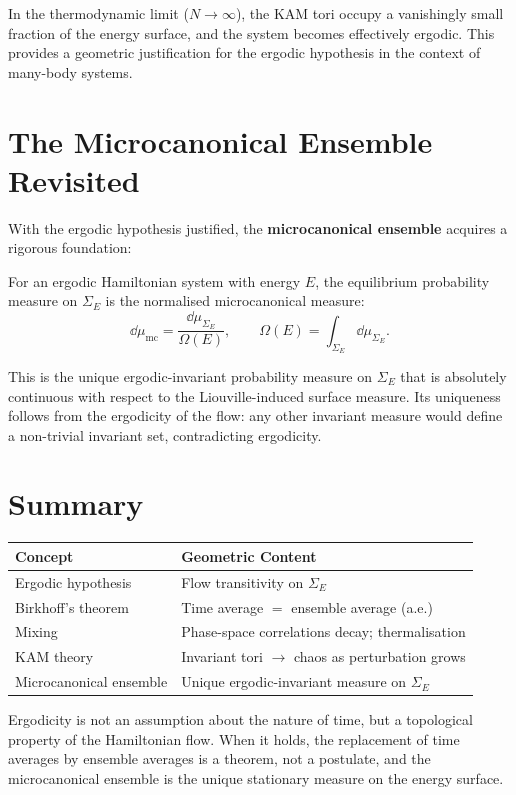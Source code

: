 In the thermodynamic limit ($N \to \infty$), the KAM tori occupy a vanishingly small fraction of the energy surface, and the system becomes effectively ergodic. This provides a geometric justification for the ergodic hypothesis in the context of many-body systems.

\section{The Microcanonical Ensemble Revisited}

With the ergodic hypothesis justified, the \textbf{microcanonical ensemble} acquires a rigorous foundation:

\begin{definition}
For an ergodic Hamiltonian system with energy $E$, the equilibrium probability measure on $\Sigma_E$ is the normalised microcanonical measure:
\begin{equation}
\dd\mu_{\text{mc}} = \frac{\dd\mu_{\Sigma_E}}{\Omega(E)}, \qquad \Omega(E) = \int_{\Sigma_E}\dd\mu_{\Sigma_E}.
\end{equation}
\end{definition}

This is the unique ergodic-invariant probability measure on $\Sigma_E$ that is absolutely continuous with respect to the Liouville-induced surface measure. Its uniqueness follows from the ergodicity of the flow: any other invariant measure would define a non-trivial invariant set, contradicting ergodicity.

\section{Summary}

\begin{table}[H]
\centering
\renewcommand{\arraystretch}{1.6}
\begin{tabular}{ll}
\toprule
\textbf{Concept} & \textbf{Geometric Content} \\
\midrule
Ergodic hypothesis & Flow transitivity on $\Sigma_E$ \\
Birkhoff's theorem & Time average $=$ ensemble average (a.e.) \\
Mixing & Phase-space correlations decay; thermalisation \\
KAM theory & Invariant tori $\to$ chaos as perturbation grows \\
Microcanonical ensemble & Unique ergodic-invariant measure on $\Sigma_E$ \\
\bottomrule
\end{tabular}
\end{table}

Ergodicity is not an assumption about the nature of time, but a topological property of the Hamiltonian flow. When it holds, the replacement of time averages by ensemble averages is a theorem, not a postulate, and the microcanonical ensemble is the unique stationary measure on the energy surface.
